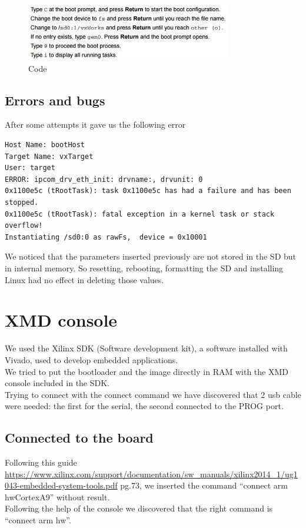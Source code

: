 \begin{figure}[h]
	\centering		\includegraphics[width=0.8\textwidth]{img/code}
	\caption{Code}
    	\label{fig:code}
\end{figure}

\subsection{Errors and bugs}
After some attempts it gave us the following error\\

\begin{lstlisting}[style=myCode]
Host Name: bootHost
Target Name: vxTarget
User: target
ERROR: ipcom_drv_eth_init: drvname:, drvunit: 0
0x1100e5c (tRootTask): task 0x1100e5c has had a failure and has been stopped.
0x1100e5c (tRootTask): fatal exception in a kernel task or stack overflow!
Instantiating /sd0:0 as rawFs,  device = 0x10001
\end{lstlisting} 

We noticed that the parameters inserted previously are not stored in the SD but in internal memory. So resetting, rebooting, formatting the SD and installing Linux had no effect in deleting those values.

\section{XMD console}
We used the Xilinx SDK (Software development kit), a software installed with Vivado, used to develop embedded applications.\\
We tried to put the bootloader and the image directly in RAM with the XMD console included in the SDK.\\
Trying to connect with the connect command we have discovered that 2 usb cable were needed: the first for the serial, the second connected to the PROG port.

\subsection{Connected to the board}
Following this guide \url{https://www.xilinx.com/support/documentation/sw_manuals/xilinx2014_1/ug1043-embedded-system-tools.pdf} pg.73, we inserted the command “connect arm hwCortexA9” without result.\\
Following the help of the console we discovered that the right command is “connect arm hw”.\\

